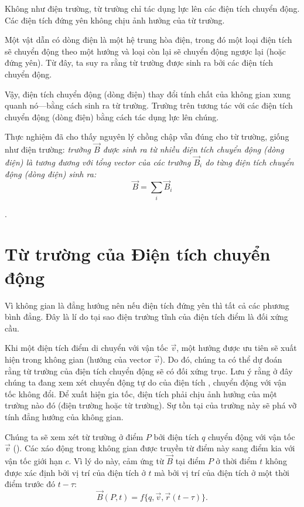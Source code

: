 Không như điện trường, từ trường chỉ tác dụng lực lên các điện tích chuyển động. Các điện tích đứng yên không chịu ảnh hưởng của từ trường.

Một vật dẫn có dòng điện là một hệ trung hòa điện, trong đó một loại điện tích sẽ chuyển động theo một hướng và loại còn lại sẽ chuyển động ngược lại (hoặc đứng yên). Từ đây, ta suy ra rằng từ trường được sinh ra bởi các điện tích chuyển động.

Vậy, điện tích chuyển động (dòng điện) thay đổi tính chất của không gian xung quanh nó---bằng cách sinh ra từ trường. Trường trên tương tác với các điện tích chuyển động (dòng điện) bằng cách tác dụng lực lên chúng.

Thực nghiệm đã cho thấy nguyên lý chồng chập vẫn đúng cho từ trường, giống như điện trường: \textit{trường $\vec{B}$ được sinh ra từ nhiều điện tích chuyển động (dòng điện) là tương đương với tổng vector của các trường $\vec{B}_i$ do từng điện tích chuyển động (dòng điện) sinh ra:}
\begin{equation}\label{eq:6_16}
    \vec{B} = \sum_i \vec{B}_i
\end{equation}

.

\section{Từ trường của Điện tích chuyển động}\label{sec:6_3}

Vì không gian là đẳng hướng nên nếu điện tích đứng yên thì tất cả các phương bình đẳng.   Đây là lí do tại sao điện trường tĩnh của điện tích điểm là đối xứng cầu.

Khi một điện tích điểm di chuyển với vận tốc $\vec{v}$, một hướng được ưu tiên sẽ xuất hiện trong không gian (hướng của vector $\vec{v}$). Do đó, chúng ta có thể dự đoán rằng từ trường của điện tích chuyển động sẽ có đối xứng trục. Lưu ý rằng ở đây chúng ta đang xem xét chuyển động tự do của điện tích \ie, chuyển động với vận tốc không đổi. Để xuất hiện gia tốc, điện tích phải chịu ảnh hưởng của một trường nào đó (điện trường hoặc từ trường). Sự tồn tại của trường này sẽ phá vỡ tính đẳng hướng của không gian.

Chúng ta sẽ xem xét từ trường ở điểm $P$ bởi điện tích $q$ chuyển động với vận tốc $\vec{v}$ (). Các xáo động trong không gian được truyền từ điểm này sang điểm kia với vận tốc giới hạn $c$. Vì lý do này, cảm ứng từ $\vec{B}$ tại điểm $P$ ở thời điểm $t$ không được xác định bởi vị trí của điện tích ở $t$ mà bởi vị trí của điện tích ở một thời điểm trước đó $t-\tau$:
\begin{equation*}
    \vec{B}(P,t) = f\{q, \vec{v}, \vec{r}(t-\tau)\}.
\end{equation*}

